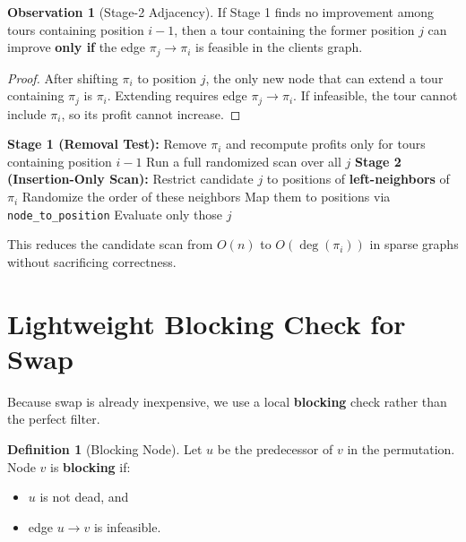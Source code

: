 \documentclass[11pt]{article}
\theoremstyle{definition}
\newtheorem{definition}{Definition}[section]
\newtheorem{observation}{Observation}[section]
\begin{document}
\begin{observation}[Stage-2 Adjacency]
If Stage 1 finds no improvement among tours containing position $i-1$, then a tour containing the former position $j$ can improve \textbf{only if} the edge $\pi_j \to \pi_i$ is feasible in the clients graph.
\end{observation}

\begin{proof}
After shifting $\pi_i$ to position $j$, the only new node that can extend a tour containing $\pi_j$ is $\pi_i$. Extending requires edge $\pi_j \to \pi_i$. If infeasible, the tour cannot include $\pi_i$, so its profit cannot increase.
\end{proof}

\begin{algorithm}
\caption{Shift Filter}
\begin{algorithmic}[1]
\State \textbf{Stage 1 (Removal Test):}
\State Remove $\pi_i$ and recompute profits only for tours containing position $i-1$
    \State Run a full randomized scan over all $j$
\Else
    \State \textbf{Stage 2 (Insertion-Only Scan):}
    \State Restrict candidate $j$ to positions of \textbf{left-neighbors} of $\pi_i$
    \State Randomize the order of these neighbors
    \State Map them to positions via \texttt{node\_to\_position}
    \State Evaluate only those $j$
\EndIf
\end{algorithmic}
\end{algorithm}

This reduces the candidate scan from $O(n)$ to $O(\deg(\pi_i))$ in sparse graphs without sacrificing correctness.

\section{Lightweight Blocking Check for Swap}

Because swap is already inexpensive, we use a local \textbf{blocking} check rather than the perfect filter.

\begin{definition}[Blocking Node]
Let $u$ be the predecessor of $v$ in the permutation. Node $v$ is \textbf{blocking} if:
\begin{itemize}
    \item $u$ is not dead, and
    \item edge $u \to v$ is infeasible.
\end{itemize}
\end{definition}
\end{document}

